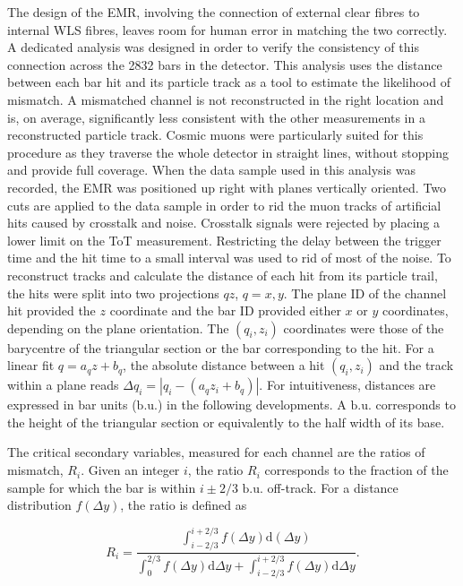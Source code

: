 \documentclass[a4paper,11pt]{article}
\begin{document}
The design of the EMR, involving the connection of external clear fibres to internal WLS fibres, leaves room for human error in matching the two correctly.
A dedicated analysis was designed in order to verify the consistency of this connection across the 2832 bars in the detector. This analysis
\cite{emr_xt, Francois} uses the distance between each bar hit and its particle track as a tool to estimate the likelihood of mismatch. A mismatched channel is
not reconstructed in the right location and is, on average, significantly less consistent with the other measurements in a reconstructed particle track.
Cosmic muons were particularly suited for this procedure as they traverse the whole detector in straight lines, without stopping and provide full coverage.
When the data sample used in this analysis was recorded, the EMR was positioned up right with planes vertically oriented. Two cuts are applied to the data sample
in order to rid the muon tracks of artificial hits caused by crosstalk and noise. Crosstalk signals were rejected by placing a lower limit on the ToT measurement.
Restricting the delay between the trigger time and the hit time to a small interval was used to rid of most of the noise. To reconstruct tracks and calculate
the distance of each hit from its particle trail, the hits were
split into two projections $qz$, $q=x,y$. The plane ID of the channel hit provided the $z$ coordinate and the bar ID provided either $x$ or $y$ coordinates,
depending on the plane orientation. The $(q_i,z_i)$ coordinates were those of the barycentre of the triangular section or the bar corresponding to the hit. For
a linear fit $q=a_qz+b_q$, the absolute distance between a hit $(q_i,z_i)$ and the track within a plane reads $\Delta q_i=|q_i-(a_qz_i+b_q)|$. For intuitiveness,
distances are expressed in bar units ($\mathrm{b.u.}$) in the following developments. A $\mathrm{b.u.}$ corresponds to the height of the triangular section or
equivalently to the half width of its base.

The critical secondary variables, measured for each channel are the ratios of mismatch, $R_i$. Given an integer $i$, the ratio $R_i$ corresponds to the fraction
of the sample for which the bar is within $i\pm2/3$ $\mathrm{b.u.}$ off-track. For a distance distribution $f(\Delta y)$, the ratio is defined as

\begin{equation}
R_i=\frac{\int_{i-2/3}^{i+2/3}f(\Delta y)\mathrm{d}(\Delta y)}{\int_{0}^{2/3}f(\Delta y)\mathrm{d}\Delta y+\int_{i-2/3}^{i+2/3}f(\Delta y)\mathrm{d}\Delta y}.
\end{equation}
\end{document}
